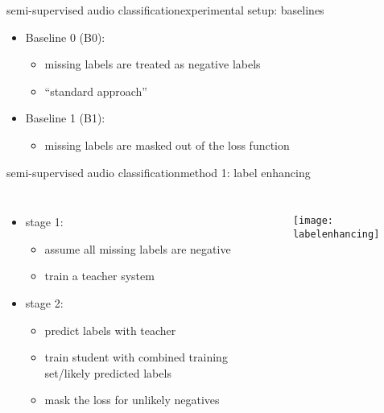 \begin{frame}{semi-supervised audio classification}{experimental setup: baselines}
    \begin{itemize}
        \item Baseline 0 (B0):
            \begin{itemize}
                \item   missing labels are treated as negative labels
                \item   ``standard approach''
            \end{itemize}
        \bigskip
        \item   Baseline 1 (B1):
            \begin{itemize}
                \item   missing labels are masked out of the loss function
            \end{itemize}
    \end{itemize}
\end{frame}

\begin{frame}{semi-supervised audio classification}{method 1: label enhancing}
    \begin{columns}
            \begin{itemize}
                \item   stage 1: 
                    \begin{itemize}
                        \item   assume all missing labels are negative 
                        \item train a teacher system
                    \end{itemize}
                \bigskip
                \item   stage 2: 
                    \begin{itemize}
                        \item   predict labels with teacher
                        \item   train student with combined training set/likely predicted labels
                        \item   mask the loss for unlikely negatives
                    \end{itemize}
            \end{itemize}
            \begin{figure}%
                \texttt{[image: labelenhancing]}%
            \end{figure}
    \end{columns}
\end{frame}

